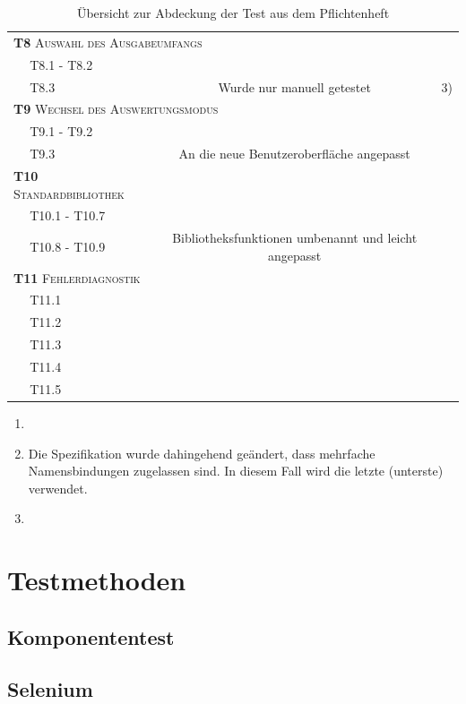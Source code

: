 \documentclass[parskip=full,11pt,openany]{scrreprt}
\newcommand{\cmark}{\ding{51}}%
\newcommand{\xmark}{\ding{55}}%
\begin{document}
\begin{table}[h]
\begin{tabular}{@{}ll|c|c|c@{}}
		\multicolumn{4}{l}{\small \textsc{\textbf{T8} Auswahl des Ausgabeumfangs}}\\ 
		&T8.1 - T8.2 & \cmark & \\
		&T8.3 & \xmark & Wurde nur manuell getestet & 3) \\ %
		\multicolumn{4}{l}{\small \textsc{\textbf{T9} Wechsel des Auswertungsmodus}}\\ 
		&T9.1 - T9.2 & \cmark & \\
		&T9.3 & \cmark & An die neue Benutzeroberfläche angepasst \\
		\multicolumn{3}{l|}{\small \textsc{\textbf{T10} Standardbibliothek}}\\ 
		&T10.1 - T10.7 & \cmark & \\
		&T10.8 - T10.9 & \cmark & Bibliotheksfunktionen umbenannt und leicht angepasst \\
		\multicolumn{3}{l|}{\small \textsc{\textbf{T11} Fehlerdiagnostik}}\\ 
		&T11.1 & \xmark & \\
		&T11.2 & \xmark & \\
		&T11.3 & \xmark & \\
		&T11.4 & \xmark & \\
		&T11.5 & \xmark & \\
		\bottomrule
	\end{tabular}
	\caption{Übersicht zur Abdeckung der Test aus dem Pflichtenheft}
\end{table}

\begin{enumerate}
\item 
\item Die Spezifikation wurde dahingehend geändert, dass mehrfache Namensbindungen zugelassen sind. In diesem Fall wird die letzte (unterste) verwendet.
\item 
\end{enumerate}


\chapter{Testmethoden}

\section{Komponententest}

\section{Selenium}
\end{document}
